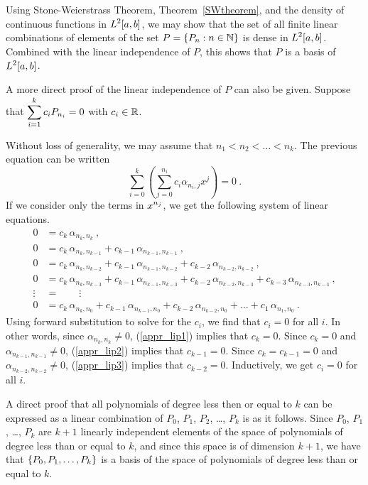 Using Stone-Weierstrass Theorem, Theorem~\ref{SWtheorem}, and the
density of continuous functions in $\displaystyle L^2[a,b]$, we may
show that the set of all finite linear combinations of elements of the set
$P = \displaystyle \{ P_n : n \in \mathbb{N} \}$ is dense in
$\displaystyle L^2[a,b]$.   Combined with the linear independence of
$P$, this shows that $P$ is a basis of $\displaystyle L^2[a,b]$.

\begin{rmk}
A more direct proof of the linear independence of $P$ can also be given.
Suppose that
$\displaystyle \sum_{i=1}^k c_i P_{n_i} = 0$ with $c_i \in \mathbb{R}$.

Without loss of generality, we may assume that $n_1 < n_2 < \ldots < n_k$.
The previous equation can be written
\[
\sum_{i=0}^k \left( \sum_{j=0}^{n_i} c_i \alpha_{n_i,j} x^j\right) = 0 \ .
\]
If we consider only the terms in $\displaystyle x^{n_j}$, we get the following
system of linear equations.
\begin{align}
0 &= c_k\, \alpha_{n_k,n_k} \ ,\label{appr_lip1} \\
0 &= c_k\, \alpha_{n_k,n_{k-1}} + c_{k-1}\, \alpha_{n_{k-1}, n_{k-1}}
\ , \label{appr_lip2} \\
0 &= c_k\, \alpha_{n_k,n_{k-2}} + c_{k-1}\, \alpha_{n_{k-1}, n_{k-2}}
+ c_{k-2}\, \alpha_{n_{k-2}, n_{k-2}} \label{appr_lip3} \ , \\
0 &= c_k\, \alpha_{n_k,n_{k-3}} + c_{k-1}\, \alpha_{n_{k-1}, n_{k-3}}
+ c_{k-2}\, \alpha_{n_{k-2}, n_{k-3}} + c_{k-3}\, \alpha_{n_{k-3}, n_{k-3}} \ ,
\label{appr_lip4} \\
\vdots\, &= \qquad \vdots \nonumber \\
0 &= c_k\, \alpha_{n_k,n_0} + c_{k-1}\, \alpha_{n_{k-1}, n_0}
+ c_{k-2}\, \alpha_{n_{k-2}, n_0} +
\ldots + c_1\, \alpha_{n_1, n_0} \ . \label{appr_lip5}
\end{align}
Using forward substitution to solve for the $c_i$, we find that
$c_i=0$ for all $i$.  In other words, since $\alpha_{n_k,n_k} \neq 0$,
(\ref{appr_lip1}) implies that $c_k=0$.  Since $c_k=0$ and
$\alpha_{n_{k-1},n_{k-1}} \neq 0$, (\ref{appr_lip2}) implies that
$c_{k-1}=0$.  Since $c_k= c_{k-1} = 0$ and $\alpha_{n_{k-2},n_{k-2}} \neq 0$,
(\ref{appr_lip3}) implies that $c_{k-2}=0$.  Inductively, we get
$c_i=0$ for all $i$.
\end{rmk}

\begin{rmk}
A direct proof that all polynomials of degree less then or equal to $k$
can be expressed as a linear combination of $P_0$, $P_1$, $P_2$,
\ldots, $P_k$ is as it follows.  Since $P_0$, $P_1$, \ldots , $P_k$
are $k+1$ linearly independent elements of the space of polynomials of degree
less than or equal to $k$, and since this space is of dimension $k+1$, we have
that $\displaystyle \left\{ P_0, P_1, \ldots , P_k\right\}$ is a
basis of the space of polynomials of degree less than or equal to $k$.
\end{rmk}

